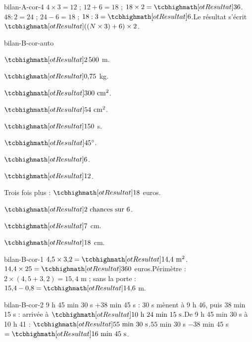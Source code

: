 \begin{blocEdition}{bilan-A-cor-4}
$4\times3=12$ ; $12+6=18$ ; $18\times2=\res{36}$.$48:2=24$ ; $24-6=18$ ; $18:3=\res6$.Le résultat s’écrit $\res{((N\times3)+6)\times2}$.
\end{blocEdition}
\begin{blocEdition}{bilan-B-cor-auto}
\begin{questions}
\item $\res{2\,500}$ m.
\item $\res{0{,}75}$ kg.
\item $\res{300\ \mathrm{cm}^2}$.
\item $\res{54\ \mathrm{cm}^2}$.
\item $\res{150}$ s.
\item $\res{45^\circ}$.
\item $\res6$.
\item $\res{12}$.
\item Trois fois plus : $\res{18}$ euros.
\item $\res{2\ \text{chances sur }6}$.
\item $\res7$ cm.
\item $\res{18}$ cm.\end{questions}
\end{blocEdition}
\begin{blocEdition}{bilan-B-cor-1}
$4{,}5\times3{,}2=\res{14{,}4\ \mathrm m^2}$.$14{,}4\times25=\res{360}$ euros.Périmètre : $2\times(4{,}5+3{,}2)=15{,}4$ m ; sans la porte : $15{,}4-0{,}8=\res{14{,}6}$ m.
\end{blocEdition}
\begin{blocEdition}{bilan-B-cor-2}
$9$ h 45 min 30 s $+38$ min 45 s : 30 s mènent à 9 h 46, puis 38 min 15 s : arrivée à $\res{10\ \text h\ 24\ \text{min}\ 15\ \text s}$.De 9 h 45 min 30 s à 10 h 41 : $\res{55\ \text{min}\ 30\ \text s}$.$55$ min 30 s $-38$ min 45 s $=\res{16\ \text{min}\ 45\ \text s}$.
\end{blocEdition}
